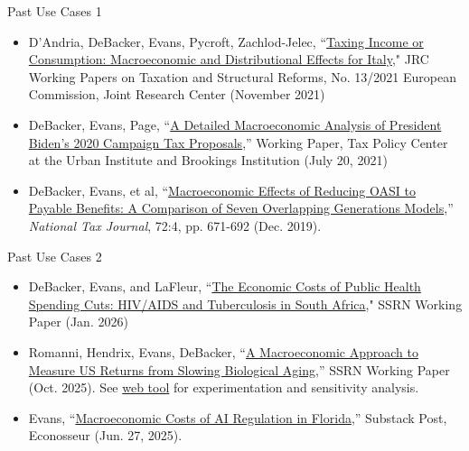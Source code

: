 \documentclass{beamer}
\begin{document}
  \begin{frame}{Past Use Cases 1}
    \begin{itemize}
      \item D'Andria, DeBacker, Evans, Pycroft, Zachlod-Jelec, ``\href{https://ec.europa.eu/jrc/sites/default/files/jrc127016.pdf}{Taxing Income or Consumption: Macroeconomic and Distributional Effects for Italy}," JRC Working Papers on Taxation and Structural Reforms, No. 13/2021 European Commission, Joint Research Center (November 2021)
      \vspace{5mm}
      \item DeBacker, Evans, Page, ``\href{https://www.taxpolicycenter.org/publications/detailed-macroeconomic-analysis-president-bidens-2020-campaign-tax-proposals}{A Detailed Macroeconomic Analysis of President Biden's 2020 Campaign Tax Proposals},” Working Paper, Tax Policy Center at the Urban Institute and Brookings Institution (July 20, 2021)
      \vspace{5mm}
      \item DeBacker, Evans, et al, ``\href{https://drive.google.com/file/d/14lLSDYu905-gCtXM-0cQl9Myxl0i2zIH/view?usp=sharing}{Macroeconomic Effects of Reducing OASI to Payable Benefits: A Comparison of Seven Overlapping
      Generations Models},'' \textit{National Tax Journal}, 72:4, pp. 671-692 (Dec. 2019).
    \end{itemize}
  \end{frame}

  \begin{frame}{Past Use Cases 2}
    \begin{itemize}
      \item DeBacker, Evans, and LaFleur, ``\href{https://papers.ssrn.com/sol3/papers.cfm?abstract_id=5336661}{The Economic Costs of Public Health Spending Cuts: HIV/AIDS and Tuberculosis in South Africa}," SSRN Working Paper (Jan. 2026)
      \vspace{5mm}
      \item Romanni, Hendrix, Evans, DeBacker, ``\href{https://papers.ssrn.com/sol3/papers.cfm?abstract_id=5572399}{A Macroeconomic Approach to Measure US Returns from Slowing Biological Aging},” SSRN Working Paper (Oct. 2025). See \href{https://silverlinings.bio/}{web tool} for experimentation and sensitivity analysis.
      \vspace{5mm}
      \item Evans, ``\href{https://rickecon.substack.com/p/macro-costs-of-ai-reg-fl}{Macroeconomic Costs of AI Regulation in Florida},'' Substack Post, Econosseur (Jun. 27, 2025).
    \end{itemize}
  \end{frame}
\end{document}
